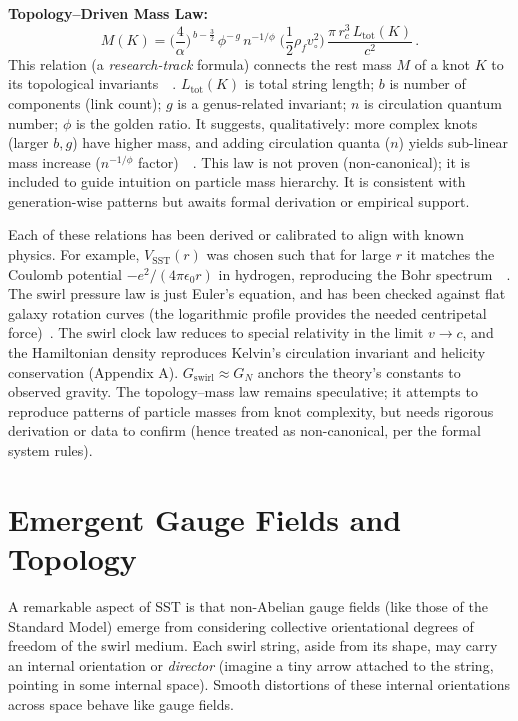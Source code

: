 \documentclass[aps,onecolumn,10pt,nofootinbib]{revtex4}
\begin{document}
\begin{tcolorbox}[title=Master Equations of SST (v0.5.6)]
		\textbf{Topology–Driven Mass Law:}
		\[
			M (K) = \Big(\frac{4}{\alpha}\Big)^{\,b-\frac{3}{2}}\,\phi^{-\,g}\,n^{-1/\phi}\;\Big(\frac{1}{2}\rho_f v_{\circ}^2\Big)\,\frac{\pi\,r_c^3\,L_{\text{tot}}(K)}{c^2}\,.
		\]
		This relation (a \emph{research-track} formula) connects the rest mass $M$ of a knot $K$ to its topological invariants~\cite{index74}~\cite{index75}. $L_{\text{tot}}(K)$ is total string length; $b$ is number of components (link count); $g$ is a genus-related invariant; $n$ is circulation quantum number; $\phi$ is the golden ratio. It suggests, qualitatively: more complex knots (larger $b,g$) have higher mass, and adding circulation quanta ($n$) yields sub-linear mass increase ($n^{-1/\phi}$ factor)~\cite{index76}~\cite{index77}. This law is not proven (non-canonical); it is included to guide intuition on particle mass hierarchy. It is consistent with generation-wise patterns but awaits formal derivation or empirical support.
	\end{tcolorbox}

	Each of these relations has been derived or calibrated to align with known physics. For example, $V_{\text{SST}}(r)$ was chosen such that for large $r$ it matches the Coulomb potential $-e^2/(4\pi\epsilon_0 r)$ in hydrogen, reproducing the Bohr spectrum~\cite{index78}~\cite{index79}. The swirl pressure law is just Euler’s equation, and has been checked against flat galaxy rotation curves (the logarithmic profile provides the needed centripetal force)~\cite{index80}. The swirl clock law reduces to special relativity in the limit $v\to c$, and the Hamiltonian density reproduces Kelvin’s circulation invariant and helicity conservation (Appendix A). $G_{\text{swirl}}\approx G_N$ anchors the theory’s constants to observed gravity. The topology–mass law remains speculative; it attempts to reproduce patterns of particle masses from knot complexity, but needs rigorous derivation or data to confirm (hence treated as non-canonical, per the formal system rules).

	\section{Emergent Gauge Fields and Topology}
	A remarkable aspect of SST is that non-Abelian gauge fields (like those of the Standard Model) emerge from considering collective orientational degrees of freedom of the swirl medium. Each swirl string, aside from its shape, may carry an internal orientation or \emph{director} (imagine a tiny arrow attached to the string, pointing in some internal space). Smooth distortions of these internal orientations across space behave like gauge fields.
\end{document}
